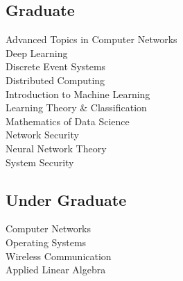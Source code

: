 \documentclass[]{onepage}
\begin{document}
\begin{minipage}[t]{0.33\textwidth}
\subsection{Graduate}
Advanced Topics in Computer Networks \\
Deep Learning \\
Discrete Event Systems \\
Distributed Computing \\
Introduction to Machine Learning \\
Learning Theory \& Classification \\
Mathematics of Data Science \\
Network Security \\
Neural Network Theory \\
System Security \\
\vspace{0.1cm}
\subsection{Under Graduate}
Computer Networks \\
Operating Systems \\
Wireless Communication \\
Applied Linear Algebra \\

%
%

\end{minipage} 
\hfill
\end{document}
